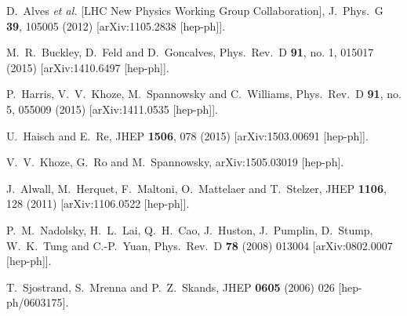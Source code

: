 \documentclass[preprintnumbers,superscriptaddress,nofootinbib,aps,prd,floatfix]{revtex4}
\begin{document}
\begin{thebibliography}{99}
  D.~Alves {\it et al.} [LHC New Physics Working Group Collaboration],
  J.\ Phys.\ G {\bf 39}, 105005 (2012)
  [arXiv:1105.2838 [hep-ph]].
  
  M.~R.~Buckley, D.~Feld and D.~Goncalves,
  Phys.\ Rev.\ D {\bf 91}, no. 1, 015017 (2015)
  [arXiv:1410.6497 [hep-ph]].

  P.~Harris, V.~V.~Khoze, M.~Spannowsky and C.~Williams,
  Phys.\ Rev.\ D {\bf 91}, no. 5, 055009 (2015)
  [arXiv:1411.0535 [hep-ph]].

  U.~Haisch and E.~Re,
  JHEP {\bf 1506}, 078 (2015)
  [arXiv:1503.00691 [hep-ph]].
  
  
  V.~V.~Khoze, G.~Ro and M.~Spannowsky,
  arXiv:1505.03019 [hep-ph].


  J.~Alwall, M.~Herquet, F.~Maltoni, O.~Mattelaer and T.~Stelzer,
  JHEP {\bf 1106}, 128 (2011)
  [arXiv:1106.0522 [hep-ph]].
 
  
  P.~M.~Nadolsky, H.~L.~Lai, Q.~H.~Cao, J.~Huston, J.~Pumplin, D.~Stump, W.~K.~Tung and C.-P.~Yuan,
  Phys.\ Rev.\ D {\bf 78} (2008) 013004
  [arXiv:0802.0007 [hep-ph]].

  T.~Sjostrand, S.~Mrenna and P.~Z.~Skands,
  JHEP {\bf 0605} (2006) 026
  [hep-ph/0603175].
  

\end{thebibliography}
\end{document}
